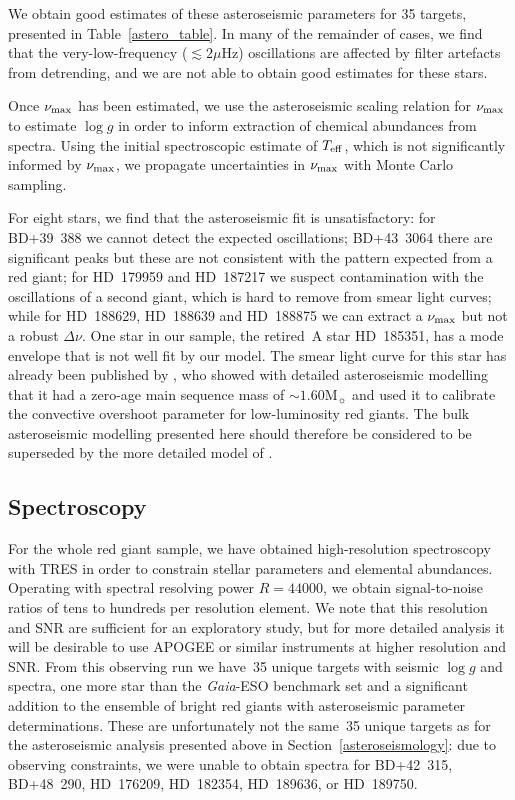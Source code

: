 \documentclass[a4paper,fleqn,usenatbib]{mnras}
\newcommand{\numax}{\mbox{$\nu_{\rm max}$}\xspace}
\newcommand{\Dnu}{\mbox{$\Delta \nu$}\xspace}
\newcommand{\muHz}{\mbox{$\mu$Hz}\xspace}
\newcommand{\teff}{\mbox{$T_{\rm eff}$}\xspace}
\newcommand{\logg}{\mbox{$\log g$}\xspace}
\newcommand{\msun}{\mbox{$\mathrm{M}_{\sun}$}\xspace}
\newcommand{\gaia}{\emph{Gaia}\xspace}
\begin{document}
We obtain good estimates of these asteroseismic parameters for 35 targets, presented in Table~\ref{astero_table}. In many of the remainder of cases, we find that the very-low-frequency ($\lesssim 2\muHz$) oscillations are affected by filter artefacts from detrending, and we are not able to obtain good estimates for these stars. 

Once \numax has been estimated, we use the asteroseismic scaling relation for \numax \citep[Equation~\ref{scaling};][]{KB95} to estimate \logg in order to inform extraction of chemical abundances from spectra. Using the initial spectroscopic estimate of \teff, which is not significantly informed by \numax, we propagate uncertainties in \numax with Monte Carlo sampling. 

For eight stars, we find that the asteroseismic fit is unsatisfactory: for BD+39~388 we cannot detect the expected oscillations; BD+43~3064 there are significant peaks but these are not consistent with the pattern expected from a red giant; for HD~179959 and HD~187217 we suspect contamination with the oscillations of a second giant, which is hard to remove from smear light curves; while for HD~188629, HD~188639 and HD~188875 we can extract a \numax but not a robust \Dnu. One star in our sample, the retired~A star HD~185351, has a mode envelope that is not well fit by our model. The smear light curve for this star has already been published by \citet{2017MNRAS.464.3713H}, who showed with detailed asteroseismic modelling that it had a zero-age main sequence mass of $\sim 1.60 \msun$ and used it to calibrate the convective overshoot parameter for low-luminosity red giants. The bulk asteroseismic modelling presented here should therefore be considered to be superseded by the more detailed model of \citet{2017MNRAS.464.3713H}. 



\subsection{Spectroscopy}
\label{spectroscopy}

For the whole red giant sample, we have obtained high-resolution spectroscopy with TRES in order to constrain stellar parameters and elemental abundances. Operating with spectral resolving power $R=44 000$, we obtain signal-to-noise ratios of tens to hundreds per resolution element. We note that this resolution and SNR are sufficient for an exploratory study, but for more detailed analysis it will be desirable to use APOGEE or similar instruments at higher resolution and SNR. From this observing run we have~35 unique targets with seismic \logg and spectra, one more star than the \gaia-ESO benchmark set and a significant addition to the ensemble of bright red giants with asteroseismic parameter determinations. These are unfortunately not the same~35 unique targets as for the asteroseismic analysis presented above in Section~\ref{asteroseismology}: due to observing constraints, we were unable to obtain spectra for BD+42~315, BD+48~290, HD~176209, HD~182354, HD~189636, or HD~189750.
\end{document}
